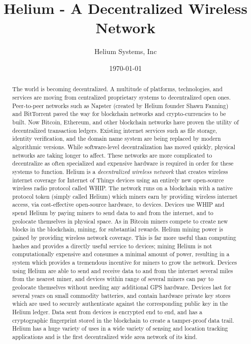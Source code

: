 \documentclass[letterpaper,11pt]{article}
\begin{document}
\title{Helium - A Decentralized Wireless Network}
\author{Helium Systems, Inc}
\date{\today}
\maketitle
\newpage

\begin{abstract}
The world is becoming decentralized. A multitude of platforms, technologies, and services are moving from centralized proprietary systems to decentralized open ones. Peer-to-peer networks such as Napster \cite{napster} (created by Helium founder Shawn Fanning) and BitTorrent paved the way for blockchain networks and crypto-currencies to be built. Now Bitcoin, Ethereum, and other blockchain networks have proven the utility of decentralized transaction ledgers. Existing internet services such as file storage, identity verification, and the domain name system are being replaced by modern algorithmic versions. While software-level decentralization has moved quickly, physical networks are taking longer to affect. These networks are more complicated to decentralize as often specialized and expensive hardware is required in order for these systems to function.\newline
\newline
Helium is a \emph{decentralized wireless network} that creates wireless internet coverage for Internet of Things devices using an entirely new open-source wireless radio protocol called WHIP. The network runs on a blockchain with a native protocol token (simply called Helium) which miners earn by providing wireless internet access, via cost-effective open-source hardware, to devices. Devices use WHIP and spend Helium by paying miners to send data to and from the internet, and to geolocate themselves in physical space. As in Bitcoin miners compete to create new blocks in the blockchain, mining, for substantial rewards. Helium mining power is gained by providing wireless network coverage. This is far more useful than computing hashes and provides a directly useful service to devices; mining Helium is not computationally expensive and consumes a minimal amount of power, resulting in a system which provides a tremendous incentive for miners to grow the network. Devices using Helium are able to send and receive data to and from the internet several miles from the nearest miner, and devices within range of several miners can pay to geolocate themselves without needing any additional GPS hardware. Devices last for several years on small commodity batteries, and contain hardware private key stores which are used to securely authenticate against the corresponding public key in the Helium ledger. Data sent from devices is encrypted end to end, and has a cryptographic fingerprint stored in the blockchain to create a tamper-proof data trail.
\newline\newline
Helium has a huge variety of uses in a wide variety of sensing and location tracking applications and is the first decentralized wide area network of its kind.
\end{abstract}
\end{document}
